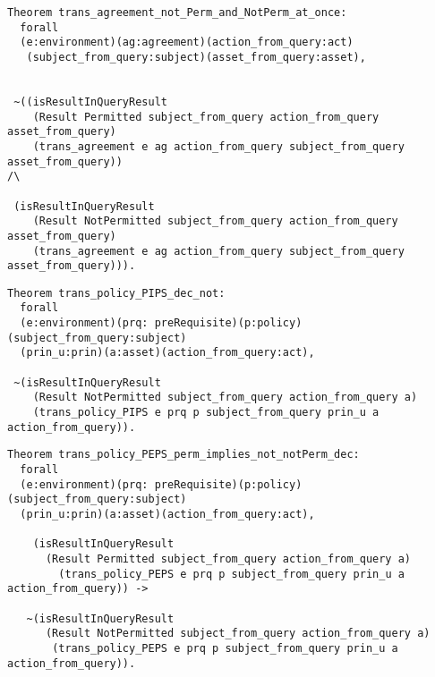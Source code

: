 \begin{lstlisting}
Theorem trans_agreement_not_Perm_and_NotPerm_at_once:
  forall
  (e:environment)(ag:agreement)(action_from_query:act)
   (subject_from_query:subject)(asset_from_query:asset),


 ~((isResultInQueryResult 
    (Result Permitted subject_from_query action_from_query asset_from_query)
    (trans_agreement e ag action_from_query subject_from_query asset_from_query)) 
/\

 (isResultInQueryResult 
    (Result NotPermitted subject_from_query action_from_query asset_from_query)
    (trans_agreement e ag action_from_query subject_from_query asset_from_query))).

\end{lstlisting}


\begin{lstlisting}
Theorem trans_policy_PIPS_dec_not:
  forall
  (e:environment)(prq: preRequisite)(p:policy)(subject_from_query:subject)
  (prin_u:prin)(a:asset)(action_from_query:act),

 ~(isResultInQueryResult 
    (Result NotPermitted subject_from_query action_from_query a)
    (trans_policy_PIPS e prq p subject_from_query prin_u a action_from_query)).

\end{lstlisting}


\begin{lstlisting}
Theorem trans_policy_PEPS_perm_implies_not_notPerm_dec:
  forall
  (e:environment)(prq: preRequisite)(p:policy)(subject_from_query:subject)
  (prin_u:prin)(a:asset)(action_from_query:act),

    (isResultInQueryResult 
      (Result Permitted subject_from_query action_from_query a)
        (trans_policy_PEPS e prq p subject_from_query prin_u a action_from_query)) ->

   ~(isResultInQueryResult 
      (Result NotPermitted subject_from_query action_from_query a)
       (trans_policy_PEPS e prq p subject_from_query prin_u a action_from_query)).

\end{lstlisting}


